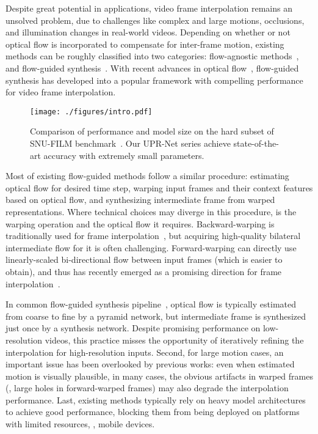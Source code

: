 \documentclass[10pt,twocolumn,letterpaper]{article}
\begin{document}
Despite great potential in applications, video frame interpolation remains an
unsolved problem, due to challenges like complex and large motions, occlusions,
and illumination changes in real-world videos. Depending on whether or not
optical flow is incorporated to compensate for inter-frame motion, existing
methods can be roughly classified into two categories: flow-agnostic
methods~\cite{niklaus2017video,meyer2018phasenet,cheng2020video,choi2020channel},
and flow-guided
synthesis~\cite{jiang2018super,liu2017video,niklaus2018context,bao2019memc,niklaus2020softmax,park2020bmbc,park2021asymmetric}.
With recent advances in optical
flow~\cite{ilg2017flownet,hui2018liteflownet,sun2018pwc,teed2020raft},
flow-guided synthesis has developed into a popular framework with compelling
performance for video frame interpolation.



\begin{figure}[tb]
\centering
\texttt{[image: ./figures/intro.pdf]}
\caption{Comparison of performance and model size on the hard subset of SNU-FILM
benchmark~\cite{choi2020channel}.  Our UPR-Net series achieve state-of-the-art
accuracy with extremely small parameters.}
\vspace{-0.25cm}
\label{fig:intro}
\end{figure}



Most of existing flow-guided methods follow a similar procedure: estimating
optical flow for desired time step, warping input frames and their context
features based on optical flow, and synthesizing intermediate frame from warped
representations. Where technical choices may diverge in this procedure, is the
warping operation and the optical flow it requires.  Backward-warping is
traditionally used for frame
interpolation~\cite{jiang2018super,liu2017video,bao2019memc,park2020bmbc,park2021asymmetric},
but acquiring high-quality bilateral intermediate flow for it is often
challenging. Forward-warping can directly use linearly-scaled bi-directional
flow between input frames (which is easier to obtain), and thus has recently
emerged as a promising direction for frame
interpolation~\cite{niklaus2018context,niklaus2020softmax}.




In common flow-guided synthesis
pipeline~\cite{bao2019depth,niklaus2020softmax,park2021asymmetric,lee2022enhanced},
optical flow is typically estimated from coarse to fine by a pyramid network,
but intermediate frame is synthesized just once by a synthesis network. Despite
promising performance on low-resolution videos, this practice misses the
opportunity of iteratively refining the interpolation for high-resolution
inputs. Second, for large motion cases, an important issue has been overlooked
by previous works: even when estimated motion is visually plausible, in many
cases, the obvious artifacts in warped frames (\eg, large holes in
forward-warped frames) may also degrade the interpolation performance.  Last,
existing methods typically rely on heavy model architectures to achieve good
performance, blocking them from being deployed on platforms with limited
resources, \eg, mobile devices.
\end{document}

